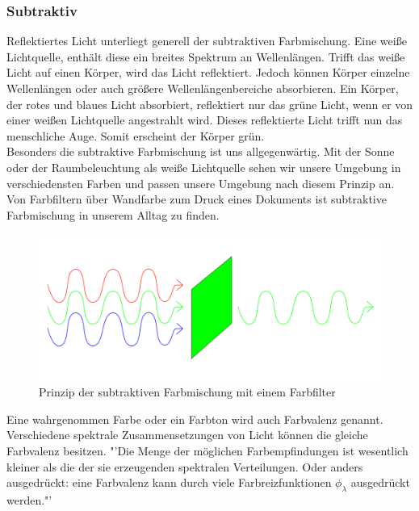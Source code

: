 \documentclass[11pt]{scrartcl}
\begin{document}
\subsubsection{Subtraktiv}
Reflektiertes Licht unterliegt generell der subtraktiven Farbmischung. Eine weiße Lichtquelle, enthält diese ein breites Spektrum an
Wellenlängen. Trifft das weiße Licht auf einen Körper, wird das Licht reflektiert. Jedoch können Körper einzelne Wellenlängen oder auch
größere Wellenlängenbereiche absorbieren. Ein Körper, der rotes und blaues Licht absorbiert, reflektiert nur das grüne Licht, wenn er von
einer weißen Lichtquelle angestrahlt wird. Dieses reflektierte Licht trifft nun das menschliche Auge. Somit erscheint der Körper grün.
\cite[62]{lichtquellen}\\
Besonders die subtraktive Farbmischung ist uns allgegenwärtig. Mit der Sonne oder der Raumbeleuchtung als weiße Lichtquelle sehen wir
unsere Umgebung in verschiedensten Farben und passen unsere Umgebung nach diesem Prinzip an. Von Farbfiltern über Wandfarbe zum Druck eines
Dokuments ist subtraktive Farbmischung in unserem Alltag zu finden.
\vspace{-10pt}
\begin{figure}[H]
    \begin{center}
        \includegraphics[width=.7\textwidth]{images/substractive_color_mixing.png}
    \end{center}
    \caption{Prinzip der subtraktiven Farbmischung mit einem Farbfilter}
\end{figure}
\noindent
Eine wahrgenommen Farbe oder ein Farbton wird auch Farbvalenz genannt. Verschiedene spektrale Zusammensetzungen von Licht können die
gleiche Farbvalenz besitzen. "'Die Menge der möglichen Farbempfindungen ist wesentlich kleiner als die der sie erzeugenden spektralen
Verteilungen. Oder anders ausgedrückt: eine Farbvalenz kann durch viele Farbreizfunktionen $\phi_\lambda$ ausgedrückt werden."'\cite[63]{lichtquellen}
\clearpage

\end{document}
